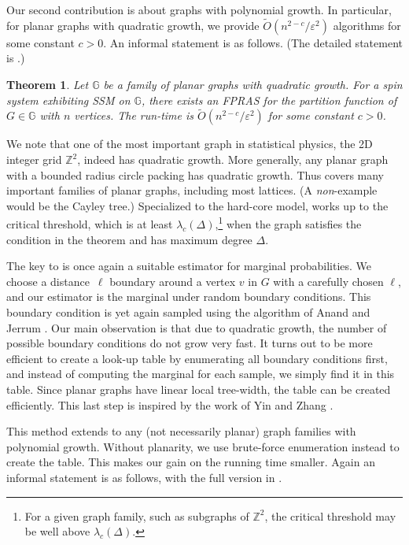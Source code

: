 \documentclass[11pt]{amsart}
\def\=#1{\mathbb{#1}}
\newcommand{\eps}{\varepsilon}
\newtheorem{theorem}{Theorem}
\theoremstyle{definition}
\theoremstyle{remark}
\begin{document}
Our second contribution is about graphs with polynomial growth.
In particular, for planar graphs with quadratic growth,
we provide $\widetilde{O}(n^{2-c}/\eps^2)$ algorithms for some constant $c>0$.
An informal statement is as follows.
(The detailed statement is .)

\begin{theorem}\label{thm:main2}
  Let $\=G$ be a family of planar graphs with quadratic growth.
  For a spin system exhibiting SSM on $\=G$,
  there exists an FPRAS for the partition function of $G\in\=G$ with $n$ vertices.
  The run-time is $\widetilde{O}(n^{2-c}/\eps^2)$ for some constant $c>0$.
\end{theorem}

We note that one of the most important graph in statistical physics, the 2D integer grid $\=Z^2$, indeed has quadratic growth.
More generally, any planar graph with a bounded radius circle packing has quadratic growth.
Thus  covers many important families of planar graphs, including most lattices.
(A \emph{non}-example would be the Cayley tree.)
Specialized to the hard-core model, 
 works up to the critical threshold, which is at least $\lambda_c(\Delta)$,\footnote{For a given graph family, such as subgraphs of $\mathbb{Z}^2$, the critical threshold may be well above $\lambda_c(\Delta)$.}
when the graph satisfies the condition in the theorem and has maximum degree $\Delta$.


The key to  is once again a suitable estimator for marginal probabilities.
We choose a distance~$\ell$ boundary around a vertex $v$ in $G$ with a carefully chosen $\ell$,
and our estimator is the marginal under random boundary conditions.
This boundary condition is yet again sampled using the algorithm of Anand and Jerrum \cite{AJ22}.
Our main observation is that due to quadratic growth, 
the number of possible boundary conditions do not grow very fast.
It turns out to be more efficient to create a look-up table by enumerating all boundary conditions first,
and instead of computing the marginal for each sample,
we simply find it in this table.
Since planar graphs have linear local tree-width,
the table can be created efficiently.
This last step is inspired by the work of Yin and Zhang \cite{YZ13}.

This method extends to any (not necessarily planar) graph families with polynomial growth.
Without planarity, we use brute-force enumeration instead to create the table.
This makes our gain on the running time smaller.
Again an informal statement is as follows, with the full version in .
\end{document}
